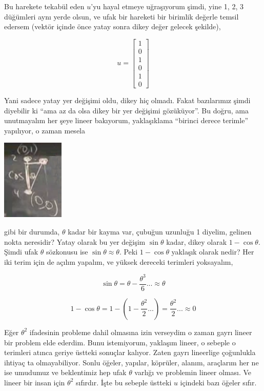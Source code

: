 \documentclass[12pt,fleqn]{article}\usepackage{../../common}
\begin{document}
Bu harekete tekabül eden $u$'yu hayal etmeye uğraşıyorum şimdi, yine 1, 2, 3
düğümleri aynı yerde olsun, ve ufak bir hareketi bir birimlik değerle temsil
edersem (vektör içinde önce yatay sonra dikey değer gelecek şekilde),

$$
u = \left[\begin{array}{r}
1 \\ 0 \\ 1 \\ 0 \\ 1 \\ 0
\end{array}\right]
$$

Yani sadece yatay yer değişimi oldu, dikey hiç olmadı. Fakat bazılarımız şimdi
diyebilir ki ``ama az da olsa dikey bir yer değişimi gözüküyor''. Bu doğru, ama
unutmayalım her şeye lineer bakıyorum, yaklaşıklama ``birinci derece terimle''
yapılıyor, o zaman mesela

\includegraphics[width=8em]{compscieng_1_15_04.png}

gibi bir durumda, $\theta$ kadar bir kayma var, çubuğun uzunluğu 1 diyelim,
gelinen nokta neresidir? Yatay olarak bu yer değişim $\sin\theta$ kadar, dikey
olarak $1-\cos\theta$. Şimdi ufak $\theta$ sözkonusu ise $\sin\theta \approx
\theta$. Peki $1-\cos\theta$ yaklaşık olarak nedir?  Her iki terim için de
açılım yapalım, ve yüksek dereceki terimleri yoksayalım,

$$
\sin\theta = \theta - \frac{\theta^3}{6} ... \approx \theta
$$

$$
1-\cos\theta = 1 - (1-\frac{\theta^2}{2} ... ) = \frac{\theta^2}{2} ... \approx 0
$$

Eğer $\theta^2$ ifadesinin probleme dahil olmasına izin verseydim o zaman gayrı
lineer bir problem elde ederdim. Bunu istemiyorum, yaklaşım lineer, o sebeple o
terimleri atınca geriye üstteki sonuçlar kalıyor. Zaten gayrı lineerlige
çoğunlukla ihtiyaç ta olmayabiliyor. Sonlu öğeler, yapılar, köprüler, alanım,
araçlarım her ne ise umudumuz ve beklentimiz hep ufak $\theta$ varlığı ve
problemin lineer olması. Ve lineer bir insan için $\theta^2$ sıfırdır. İşte
bu sebeple üstteki $u$ içindeki bazı öğeler sıfır.
\end{document}
